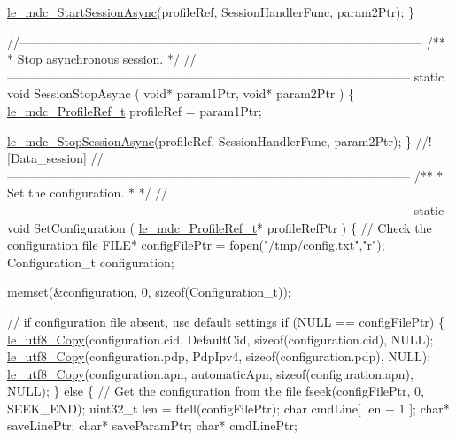 \begin{DoxyCodeInclude}
{    \hyperlink{le__mdc__interface_8h_aa03d6e31263ddf8bf1d94b183c9934d9}{le\_mdc\_StartSessionAsync}(profileRef, SessionHandlerFunc, param2Ptr);
\}

\textcolor{comment}{//--------------------------------------------------------------------------------------------------}\textcolor{comment}{}
\textcolor{comment}{/**}
\textcolor{comment}{ * Stop asynchronous session.}
\textcolor{comment}{ */}
\textcolor{comment}{//--------------------------------------------------------------------------------------------------}
\textcolor{keyword}{static} \textcolor{keywordtype}{void} SessionStopAsync
(
    \textcolor{keywordtype}{void}* param1Ptr,
    \textcolor{keywordtype}{void}* param2Ptr
)
\{
    \hyperlink{le__mdc__interface_8h_a91074d8f0d88c6645e3085dfadf87011}{le\_mdc\_ProfileRef\_t} profileRef = param1Ptr;

    \hyperlink{le__mdc__interface_8h_ac5b357f7437c9e253fa17b2511fa14ef}{le\_mdc\_StopSessionAsync}(profileRef, SessionHandlerFunc, param2Ptr);
\}
\textcolor{comment}{}
\textcolor{comment}{//! [Data\_session]}
\textcolor{comment}{}\textcolor{comment}{//--------------------------------------------------------------------------------------------------}\textcolor{comment}{}
\textcolor{comment}{/**}
\textcolor{comment}{ * Set the configuration.}
\textcolor{comment}{ *}
\textcolor{comment}{ */}
\textcolor{comment}{//--------------------------------------------------------------------------------------------------}
\textcolor{keyword}{static} \textcolor{keywordtype}{void} SetConfiguration
(
    \hyperlink{le__mdc__interface_8h_a91074d8f0d88c6645e3085dfadf87011}{le\_mdc\_ProfileRef\_t}* profileRefPtr
)
\{
    \textcolor{comment}{// Check the configuration file}
    FILE* configFilePtr = fopen(\textcolor{stringliteral}{"/tmp/config.txt"},\textcolor{stringliteral}{"r"});
    Configuration\_t configuration;

    memset(&configuration, 0, \textcolor{keyword}{sizeof}(Configuration\_t));

    \textcolor{comment}{// if configuration file absent, use default settings}
    \textcolor{keywordflow}{if} (NULL == configFilePtr)
    \{
        \hyperlink{le__utf8_8h_aa5ae72c01396c106fdf3b4741ead7477}{le\_utf8\_Copy}(configuration.cid, DefaultCid, \textcolor{keyword}{sizeof}(configuration.cid), NULL);
        \hyperlink{le__utf8_8h_aa5ae72c01396c106fdf3b4741ead7477}{le\_utf8\_Copy}(configuration.pdp, PdpIpv4, \textcolor{keyword}{sizeof}(configuration.pdp), NULL);
        \hyperlink{le__utf8_8h_aa5ae72c01396c106fdf3b4741ead7477}{le\_utf8\_Copy}(configuration.apn, automaticApn, \textcolor{keyword}{sizeof}(configuration.apn), NULL);
    \}
    \textcolor{keywordflow}{else}
    \{
        \textcolor{comment}{// Get the configuration from the file}
        fseek(configFilePtr, 0, SEEK\_END);
        uint32\_t len = ftell(configFilePtr);
        \textcolor{keywordtype}{char} cmdLine[ len + 1 ];
        \textcolor{keywordtype}{char}* saveLinePtr;
        \textcolor{keywordtype}{char}* saveParamPtr;
        \textcolor{keywordtype}{char}* cmdLinePtr;

}
\end{DoxyCodeInclude}
